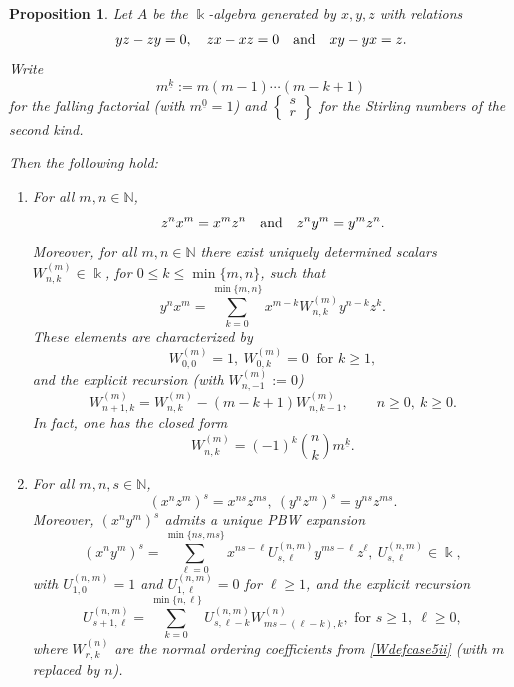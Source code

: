 \documentclass{amsart}
\newtheorem{proposition}[theorem]{Proposition}
\theoremstyle{definition}
\theoremstyle{remark}
\numberwithin{equation}{section}
\begin{document}
\begin{proposition}\label{Case(5)(ii)}
Let $A$ be the $\Bbbk$-algebra generated by $x,y,z$ with relations
\[
yz - zy = 0, \quad zx - xz=0 \quad {\rm and} \quad xy - yx = z.
\]
Write 
$$
m^{\underline{k}} := m(m-1)\cdots(m-k+1)
$$ 
for the falling factorial {\rm (}with $m^{\underline{0}}=1${\rm )} and
$\left\{\begin{matrix}s\\r\end{matrix}\right\}$ for the Stirling numbers of the second kind.

Then the following hold:
\begin{enumerate}
\item [\rm (1)] For all $m,n\in\mathbb N$,
\[
z^n x^m=x^m z^n \quad {\rm and} \quad z^n y^m=y^m z^n.
\]
Moreover, for all $m,n\in\mathbb N$ there exist uniquely determined scalars
$W^{(m)}_{n,k}\in\Bbbk$, for $0\le k\le \min\{m,n\}$, such that
\begin{equation}\label{Wdefcase5ii}
y^n x^m=\sum_{k=0}^{\min\{m,n\}} x^{m-k}W^{(m)}_{n,k} y^{n-k}z^{k}.
\end{equation}
These elements are characterized by
\[
W^{(m)}_{0,0}=1,\ W^{(m)}_{0,k}=0\ \text{ for } k\ge 1,
\]
and the explicit recursion (with $W^{(m)}_{n,-1}:=0$)
\begin{equation}\label{Wreccase5ii}
W^{(m)}_{n+1,k}=W^{(m)}_{n,k}-(m-k+1) W^{(m)}_{n,k-1},
\qquad n\ge 0,\ k\ge 0.
\end{equation}
In fact, one has the closed form
\begin{equation}\label{Wclosed_case5ii}
W^{(m)}_{n,k}=(-1)^k\binom{n}{k} m^{\underline{k}}.
\end{equation}

\item [\rm (2)] For all $m,n,s\in\mathbb N$,
\[
(x^n z^m)^s=x^{ns}z^{ms},\ (y^n z^m)^s=y^{ns}z^{ms}.
\]
Moreover, $(x^n y^m)^s$ admits a unique PBW expansion
\begin{equation}\label{Udefcase5ii}
(x^n y^m)^s=\sum_{\ell=0}^{\min\{ns,ms\}} x^{ns-\ell} U^{(n,m)}_{s,\ell} y^{ms-\ell}z^{\ell},
\ U^{(n,m)}_{s,\ell}\in\Bbbk,
\end{equation}
with $U^{(n,m)}_{1,0}=1$ and $U^{(n,m)}_{1,\ell}=0$ for $\ell\ge 1$, and the explicit recursion
\begin{equation}\label{Ureccase5ii}
U^{(n,m)}_{s+1,\ell}=\sum_{k=0}^{\min\{n,\ell\}}U^{(n,m)}_{s,\ell-k} W^{(n)}_{ms-(\ell-k), k},
\text{ for } s\ge 1,\ \ell\ge 0,
\end{equation}
where $W^{(n)}_{r,k}$ are the normal ordering coefficients from \eqref{Wdefcase5ii} (with $m$ replaced by $n$).


\end{enumerate}
\end{proposition}
\end{document}
